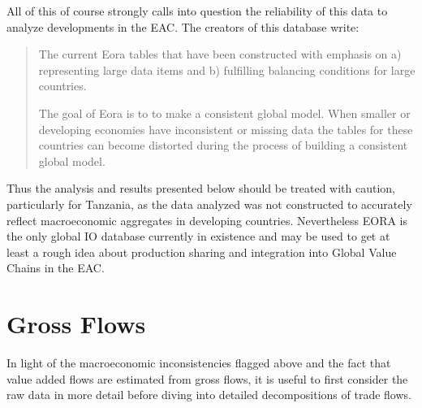\documentclass[a4paper]{article}
\begin{document}
All of this of course strongly calls into question the reliability of this data to analyze developments in the EAC. The creators of this database write:

\begin{quote}
The current Eora tables that have been constructed with emphasis on a) representing large data items and b) fulfilling balancing conditions for large countries.

The goal of Eora is to to make a consistent global model. When smaller or developing economies have inconsistent or missing data the tables for these countries can become distorted during the process of building a consistent global model. %
\end{quote}

Thus the analysis and results presented below should be treated with caution, particularly for Tanzania, as the data analyzed was not constructed to accurately reflect macroeconomic aggregates in developing countries. Nevertheless EORA is the only global IO database currently in existence and may be used to get at least a rough idea about production sharing and integration into Global Value Chains in the EAC. 

\section{Gross Flows}
In light of the macroeconomic inconsistencies flagged above and the fact that value added flows are estimated from gross flows, it is useful to first consider the raw data in more detail before diving into detailed decompositions of trade flows. 
\end{document}
